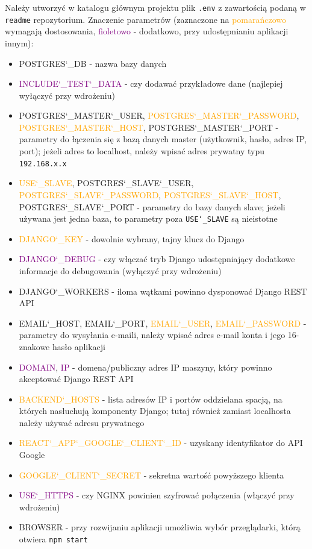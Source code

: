 \documentclass[11pt,a4paper]{article}
\renewcommand{\_}{\char`_}
\begin{document}
Należy utworzyć w katalogu głównym projektu plik \texttt{.env} z zawartością podaną w \texttt{readme} repozytorium. Znaczenie parametrów (zaznaczone na \textcolor{orange}{pomarańczowo} wymagają dostosowania, \textcolor{purple}{fioletowo} - dodatkowo, przy udostępnianiu aplikacji innym):
\begin{itemize}
    \item POSTGRES\_DB - nazwa bazy danych
    \item \textcolor{purple}{INCLUDE\_TEST\_DATA} - czy dodawać przykładowe dane (najlepiej wyłączyć przy wdrożeniu)
    \item POSTGRES\_MASTER\_USER, \textcolor{orange}{POSTGRES\_MASTER\_PASSWORD}, \textcolor{orange}{POSTGRES\_MASTER\_HOST}, POSTGRES\_MASTER\_PORT - parametry do łączenia się z bazą danych master (użytkownik, hasło, adres IP, port); jeżeli adres to localhost, należy wpisać adres prywatny typu \texttt{192.168.x.x}
    \item \textcolor{orange}{USE\_SLAVE}, POSTGRES\_SLAVE\_USER, \textcolor{orange}{POSTGRES\_SLAVE\_PASSWORD}, \textcolor{orange}{POSTGRES\_SLAVE\_HOST}, POSTGRES\_SLAVE\_PORT - parametry do bazy danych slave; jeżeli używana jest jedna baza, to parametry poza \texttt{USE\_SLAVE} są nieistotne
    \item \textcolor{orange}{DJANGO\_KEY} - dowolnie wybrany, tajny klucz do Django
    \item \textcolor{purple}{DJANGO\_DEBUG} - czy włączać tryb Django udostępniający dodatkowe informacje do debugowania (wyłączyć przy wdrożeniu)
    \item DJANGO\_WORKERS - iloma wątkami powinno dysponować Django REST API
    \item EMAIL\_HOST, EMAIL\_PORT, \textcolor{orange}{EMAIL\_USER}, \textcolor{orange}{EMAIL\_PASSWORD} - parametry do wysyłania e-maili, należy wpisać adres e-mail konta i jego 16-znakowe hasło aplikacji
    \item \textcolor{purple}{DOMAIN}, \textcolor{purple}{IP} - domena/publiczny adres IP maszyny, który powinno akceptować Django REST API
    \item \textcolor{orange}{BACKEND\_HOSTS} - lista adresów IP i portów oddzielana spacją, na których nasłuchują komponenty Django; tutaj również zamiast localhosta należy używać adresu prywatnego
    \item \textcolor{orange}{REACT\_APP\_GOOGLE\_CLIENT\_ID} - uzyskany identyfikator do API Google
    \item \textcolor{orange}{GOOGLE\_CLIENT\_SECRET} - sekretna wartość powyższego klienta
    \item \textcolor{purple}{USE\_HTTPS} - czy NGINX powinien szyfrować połączenia (włączyć przy wdrożeniu)
    \item BROWSER - przy rozwijaniu aplikacji umożliwia wybór przeglądarki, którą otwiera \texttt{npm start}
    
\end{itemize}
\end{document}
